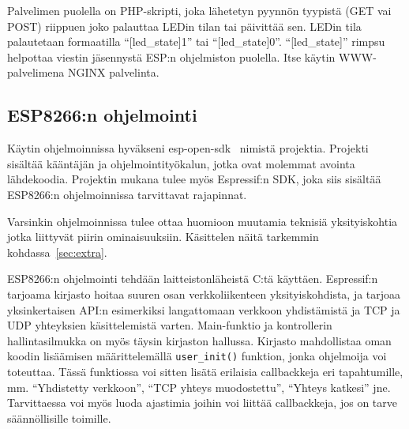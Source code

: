 Palvelimen puolella on PHP-skripti, joka lähetetyn pyynnön tyypistä (GET vai
POST) riippuen joko palauttaa LEDin tilan tai päivittää sen. LEDin tila
palautetaan formaatilla ``[led\_state]1'' tai ``[led\_state]0''.
``[led\_state]'' rimpsu helpottaa viestin jäsennystä ESP:n ohjelmiston
puolella. Itse käytin WWW-palvelimena NGINX palvelinta.

\subsection{ESP8266:n ohjelmointi}
Käytin ohjelmoinnissa hyväkseni esp-open-sdk~\cite{esp-open-sdk} nimistä
projektia. Projekti sisältää kääntäjän ja ohjelmointityökalun, jotka ovat
molemmat avointa lähdekoodia. Projektin mukana tulee myös Espressif:n SDK, joka
siis sisältää ESP8266:n ohjelmoinnissa tarvittavat rajapinnat.

Varsinkin ohjelmoinnissa tulee ottaa huomioon muutamia teknisiä yksityiskohtia
jotka liittyvät piirin ominaisuuksiin. Käsittelen näitä tarkemmin
kohdassa~\ref{sec:extra}.

ESP8266:n ohjelmointi tehdään laitteistonläheistä C:tä käyttäen. Espressif:n
tarjoama kirjasto hoitaa suuren osan verkkoliikenteen yksityiskohdista, ja
tarjoaa yksinkertaisen API:n esimerkiksi langattomaan verkkoon yhdistämistä ja
TCP ja UDP yhteyksien käsittelemistä varten. Main-funktio ja kontrollerin
hallintasilmukka on myös täysin kirjaston hallussa. Kirjasto mahdollistaa oman
koodin lisäämisen määrittelemällä \texttt{user\_init()} funktion, jonka
ohjelmoija voi toteuttaa.  Tässä funktiossa voi sitten lisätä erilaisia
callbackkeja eri tapahtumille, mm.  ``Yhdistetty verkkoon'', ``TCP yhteys
muodostettu'', ``Yhteys katkesi'' jne.  Tarvittaessa voi myös luoda ajastimia
joihin voi liittää callbackkeja, jos on tarve säännöllisille toimille.

